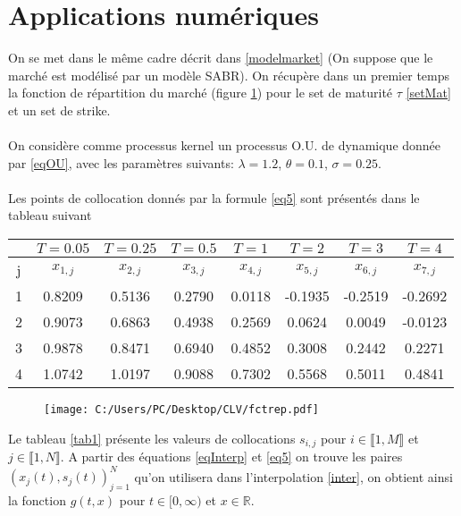 \documentclass[a4paper,12pt]{report}
\numberwithin{equation}{section}
\theoremstyle{definition}
\numberwithin{equation}{section}
\begin{document}
\section{Applications numériques}
On se met dans le même cadre décrit dans \ref{modelmarket} (On suppose que le marché est modélisé par un modèle SABR). On récupère dans un premier temps la fonction de répartition du marché (figure \ref{fctrep}) pour le set de maturité $\tau$ \ref{setMat} et un set de strike. \\\\
On considère comme processus kernel un processus O.U. de dynamique donnée par \ref{eqOU}, avec les paramètres suivants: $\lambda = 1.2$, $\theta = 0.1$, $\sigma=0.25$.\\\\ 
Les points de collocation donnés par la formule \ref{eq5} sont présentés dans le tableau suivant
\vspace*{0.2cm}
\begin{center}
\begin{tabular}{|c|c|c|c|c|c|c|c|}
\hline
 & $T=0.05$ & $T=0.25$ & $T=0.5$ & $T=1$ & $T=2$ & $T=3$ & $T=4$\\
\hline
j & $x_{1,j}$ & $x_{2,j}$ & $x_{3,j}$ &$x_{4,j}$ & $x_{5,j}$&$x_{6,j}$ & $x_{7,j}$\\
\hline
1 & 0.8209 &  0.5136 &  0.2790 & 0.0118 &-0.1935&
        -0.2519 & -0.2692\\
\hline
2& 0.9073&  0.6863&  0.4938&  0.2569& 0.0624& 0.0049 &-0.0123\\
\hline
3 & 0.9878&  0.8471&  0.6940&  0.4852&  0.3008&
         0.2442 & 0.2271\\
\hline
4& 1.0742&  1.0197&  0.9088&  0.7302&  0.5568& 0.5011& 0.4841\\
\hline
\end{tabular}
\end{center}

\begin{figure}[h!]
\texttt{[image: C:/Users/PC/Desktop/CLV/fctrep.pdf]}
\label{fctrep}
\end{figure} 
Le tableau \ref{tab1} présente les valeurs de collocations $s_{i,j}$ pour $i\in \llbracket1,M\rrbracket$ et $j\in\llbracket1,N\rrbracket $. A partir des équations \ref{eqInterp} et \ref{eq5} on trouve les paires $\left( x_j(t), s_j(t) \right)_{j=1}^N$ qu'on utilisera dans l'interpolation \ref{inter}, on obtient ainsi la fonction $g(t,x)$ pour $t\in [0,\infty)$ et $x \in \mathbb{R}$.
\end{document}
